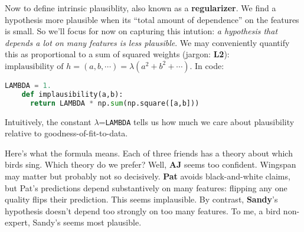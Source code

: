 
  Now to define intrinsic plausiblity, also known as a \textbf{regularizer}.
  We find a hypothesis more plausible when its ``total amount of
  dependence'' on the features is small.
  So we'll focus for now on capturing this intution:
  \emph{a hypothesis that depends a lot on many features is less
  plausible}.
  We may conveniently quantify this as
  proportional to a sum of squared weights (jargon: \textbf{L2}):
  $
    \text{implausibility of $h=(a,b, \cdots)$}
    =
    \lambda (a^2 + b^2 + \cdots)
  $.  In code:
  \begin{lstlisting}[language=Python, basicstyle=\footnotesize\ttfamily]
    LAMBDA = 1.
    def implausibility(a,b):
      return LAMBDA * np.sum(np.square([a,b]))
  \end{lstlisting}
  Intuitively, the constant $\lambda$=\texttt{LAMBDA} tells us how much we care
  about plausibility relative to goodness-of-fit-to-data.

  Here's what the formula means.
  Each of three friends has a theory
  about which birds sing.
  Which theory do we prefer?  Well, \textbf{AJ} seems too confident.  Wingspan
  may matter but probably not so decisively.  \textbf{Pat} avoids
  black-and-white claims, but Pat's predictions depend substantively on many
  features: flipping any one quality flips their prediction.  This seems
  implausible.  By contrast, \textbf{Sandy}'s hypothesis doesn't depend too
  strongly on too many features.  To me, a bird non-expert, Sandy's seems most
  plausible.

